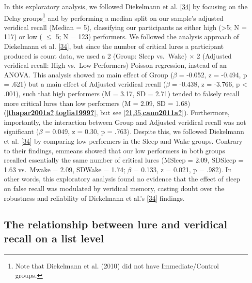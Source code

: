 \documentclass[
]{article}
\begin{document}
In this exploratory analysis, we followed Diekelmann et al. {[}\protect\hyperlink{ref-diekelmann2010a}{34}{]} by focusing on the Delay groups\footnote{Note that Diekelmann et al. (2010) did not have Immediate/Control groups.} and by performing a median split on our sample's adjusted veridical recall (Median = 5), classifying our participants as either high (\textgreater5; N = 117) or low ( \(\leq\) 5; N = 123) performers. We followed the analysis approach of Diekelmann et al. {[}\protect\hyperlink{ref-diekelmann2010a}{34}{]}, but since the number of critical lures a participant produced is count data, we used a 2 (Group: Sleep vs.~Wake) \(\times\) 2 (Adjusted veridical recall: High vs.~Low Performers) Poisson regression, instead of an ANOVA. This analysis showed no main effect of Group (\(\beta\) = -0.052, z = -0.494, p = .621) but a main effect of Adjusted veridical recall (\(\beta\) = -0.438, z = -3.766, p \textless{} .001), such that high performers (M = 3.17, SD = 2.71) tended to falsely recall more critical lures than low performers (M = 2.09, SD = 1.68) ({[}\protect\hyperlink{ref-thapar2001a}{\textbf{thapar2001a?}},\protect\hyperlink{ref-toglia1999}{\textbf{toglia1999?}}{]}, but see {[}\protect\hyperlink{ref-roediger2001a}{21},\protect\hyperlink{ref-stadler1999a}{35},\protect\hyperlink{ref-cann2011a}{\textbf{cann2011a?}}{]}). Furthermore, importantly, the interaction between Group and Adjusted veridical recall was not significant (\(\beta\) = 0.049, z = 0.30, p = .763). Despite this, we followed Diekelmann et al. {[}\protect\hyperlink{ref-diekelmann2010a}{34}{]} by comparing low performers in the Sleep and Wake groups. Contrary to their findings, emmeans showed that our low performers in both groups recalled essentially the same number of critical lures (MSleep = 2.09, SDSleep = 1.63 vs.~Mwake = 2.09, SDWake = 1.74; \(\beta\) = 0.133, z = 0.021, p = .982). In other words, this exploratory analysis found no evidence that the effect of sleep on false recall was modulated by veridical memory, casting doubt over the robustness and reliability of Diekelmann et al.'s {[}\protect\hyperlink{ref-diekelmann2010a}{34}{]} findings.

\hypertarget{the-relationship-between-lure-and-veridical-recall-on-a-list-level}{%
\subsection{The relationship between lure and veridical recall on a list level}\label{the-relationship-between-lure-and-veridical-recall-on-a-list-level}}
\end{document}
